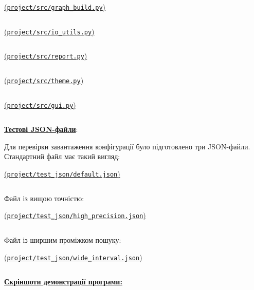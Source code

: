 \documentclass[12pt,a4paper]{article}
\begin{document}
    \vspace{1em}

    \noindent
    \underline{(\texttt{project/src/graph\_build.py})}
    \inputminted{python}{project/src/graph_build.py}

    \vspace{1em}

    \noindent
    \underline{(\texttt{project/src/io\_utils.py})}
    \inputminted{python}{project/src/io_utils.py}

    \vspace{1em}

    \noindent
    \underline{(\texttt{project/src/report.py})}
    \inputminted{python}{project/src/report.py}

    \vspace{1em}

    \noindent
    \underline{(\texttt{project/src/theme.py})}
    \inputminted{python}{project/src/theme.py}

    \vspace{1em}

    \noindent
    \underline{(\texttt{project/src/gui.py})}
    \inputminted{python}{project/src/gui.py}

    \noindent
    \textbf{\underline{Тестові JSON-файли}}:

    Для перевірки завантаження конфігурації було підготовлено три JSON-файли. Стандартний файл
    має такий вигляд:

    \noindent
    \underline{(\texttt{project/test\_json/default.json})}
    \inputminted{json}{project/test_json/default.json}

    Файл із вищою точністю:

    \noindent
    \underline{(\texttt{project/test\_json/high\_precision.json})}
    \inputminted{json}{project/test_json/high_precision.json}

    Файл із ширшим проміжком пошуку:

    \noindent
    \underline{(\texttt{project/test\_json/wide\_interval.json})}
    \inputminted{json}{project/test_json/wide_interval.json}

    \newpage

    \noindent
    \underline{\textbf{Скріншоти демонстрації програми:}}
\end{document}
